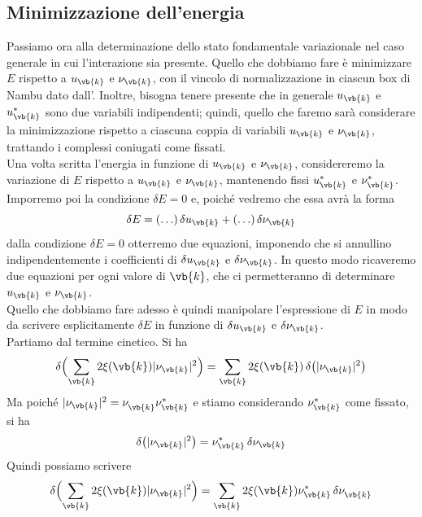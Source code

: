 \subsection{Minimizzazione dell'energia}
Passiamo ora alla determinazione dello stato fondamentale variazionale nel caso generale in cui l'interazione sia presente. Quello che dobbiamo fare è minimizzare $E$ rispetto a $u_{\vb{k}}$ e $\nu_{\vb{k}}$, con il vincolo di normalizzazione in ciascun box di Nambu dato dall'. Inoltre, bisogna tenere presente che in generale $u_{\vb{k}}$ e $u_{\vb{k}}^*$ sono due variabili indipendenti; quindi, quello che faremo sarà considerare la minimizzazione rispetto a ciascuna coppia di variabili $u_{\vb{k}}$ e $\nu_{\vb{k}}$, trattando i complessi coniugati come fissati.\\
Una volta scritta l'energia in funzione di $u_{\vb{k}}$ e $\nu_{\vb{k}}$, considereremo la variazione di $E$ rispetto a $u_{\vb{k}}$ e $\nu_{\vb{k}}$, mantenendo fissi $u_{\vb{k}}^*$ e $\nu_{\vb{k}}^*$. Imporremo poi la condizione $\delta E=0$ e, poiché vedremo che essa avrà la forma
\begin{equation*}
   \delta E
   =(\ldots)\,\delta u_{\vb{k}} + (\ldots)\,\delta \nu_{\vb{k}}
\end{equation*}
dalla condizione $\delta E=0$ otterremo due equazioni, imponendo che si annullino indipendentemente i coefficienti di $\delta u_{\vb{k}}$ e $\delta \nu_{\vb{k}}$. In questo modo ricaveremo due equazioni per ogni valore di $\vb{k}$, che ci permetteranno di determinare $u_{\vb{k}}$ e $\nu_{\vb{k}}$.\\
Quello che dobbiamo fare adesso è quindi manipolare l'espressione di $E$ in modo da scrivere esplicitamente $\delta E$ in funzione di $\delta u_{\vb{k}}$ e $\delta \nu_{\vb{k}}$.\\
Partiamo dal termine cinetico. Si ha
\begin{equation*}
   \delta \Bigl( \sum_{\vb{k}} 2 \xi(\vb{k}) |\nu_{\vb{k}}|^2 \Bigr)
   =\sum_{\vb{k}} 2 \xi(\vb{k}) \, \delta \bigl( |\nu_{\vb{k}}|^2 \bigr)
\end{equation*}
Ma poiché $|\nu_{\vb{k}}|^2=\nu^{\vphantom{*}}_{\vb{k}}\nu_{\vb{k}}^*$ e stiamo considerando $\nu_{\vb{k}}^*$ come fissato, si ha
\begin{equation*}
   \delta \bigl( |\nu_{\vb{k}}|^2 \bigr)
   =\nu_{\vb{k}}^*\, \delta \nu_{\vb{k}}
\end{equation*}
Quindi possiamo scrivere
\begin{equation*}
   \delta \Bigl( \sum_{\vb{k}} 2 \xi(\vb{k}) |\nu_{\vb{k}}|^2 \Bigr)
   =\sum_{\vb{k}} 2 \xi(\vb{k}) \nu_{\vb{k}}^* \,\delta \nu^{\vphantom{*}}_{\vb{k}}
\end{equation*}
